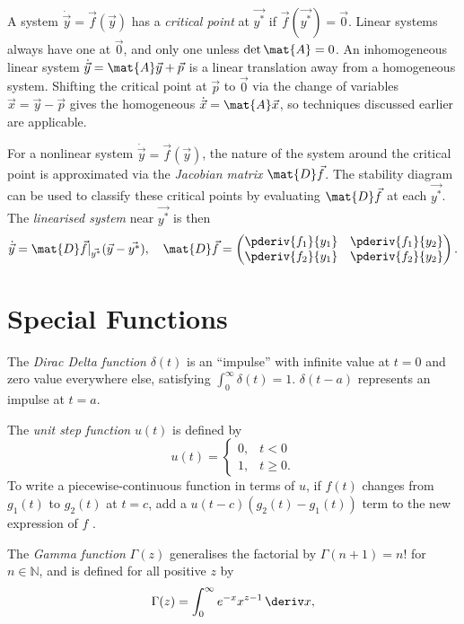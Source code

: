 \documentclass[10pt, a4paper]{article}
\begin{document}
\begin{landscape}
\begin{multicols}{2}
    A system \(\dot{\vec{y}} = \vec{f}(\vec{y})\) has a \emph{critical point} at \(\vec{y^*}\) if
    \(\vec{f}(\vec{y^*}) = \vec{0}\). Linear systems always have one at \(\vec{0}\), and only one
    unless \(\det \mat{A} = 0\).
    An inhomogeneous linear system \(\dot{\vec{y}} = \mat{A}\vec{y} + \vec{p}\) is a linear
    translation away from a homogeneous system. Shifting the critical point at \(\vec{p}\) to
    \(\vec{0}\) via the change of variables \(\vec{x} = \vec{y} - \vec{p}\) gives the homogeneous
    \(\dot{\vec{x}} = \mat{A} \vec{x}\), so techniques discussed earlier are applicable.
    
    For a nonlinear system \(\dot{\vec{y}} = \vec{f}(\vec{y})\), the nature of the system around the
    critical point is approximated via the \emph{Jacobian matrix} \(\mat{D}\vec{f}\). 
    The stability diagram can be used to classify these critical points by evaluating \(\mat{D}\vec{f}\)
    at each \(\vec{y^*}\). The \emph{linearised system} near \(\vec{y^*}\) is then
    \[
        \dot{\vec{y}} = \mat{D}\vec{f} |_{\vec{y^{*}}} (\vec{y} - \vec{y^*}),
        \quad
        \mat{D}\vec{f} = \begin{pmatrix}
            \pderiv{f_1}{y_1} & \pderiv{f_1}{y_2} \\
            \pderiv{f_2}{y_1} & \pderiv{f_2}{y_2}
        \end{pmatrix}.
    \]
    \section{Special Functions}

    The \emph{Dirac Delta function} \(\delta(t)\) is an ``impulse'' with infinite value at \(t = 0\) and
    zero value everywhere else, satisfying \(\int_0^{\infty} \delta(t) = 1\). \(\delta(t - a)\)
    represents an impulse at \(t = a\).

    The \emph{unit step function} \(u(t)\) is defined by
    \[
        u(t) = \begin{cases}
            0, & t < 0 \\
            1, & t \geq 0.
        \end{cases}  
    \]
    To write a piecewise-continuous function in terms of \(u\),
    if \(f(t)\) changes from \(g_1(t)\) to \(g_2(t)\) at \(t = c\), add a \(u(t-c) (g_2(t) - g_1(t))\) term
    to the new expression of \(f\) \cite{LaplacePractice}.

    The \emph{Gamma function} \(\Gamma(z)\) generalises the factorial by
    \(\Gamma(n + 1) = n!\) for \(n \in \mathbb{N}\), and is defined for all positive \(z\) by
    \[
        \Gamma(z) = \int_0^{\infty} e^{-x} x^{z-1} \,\deriv x,
    \]


\end{multicols}
\end{landscape}
\end{document}
